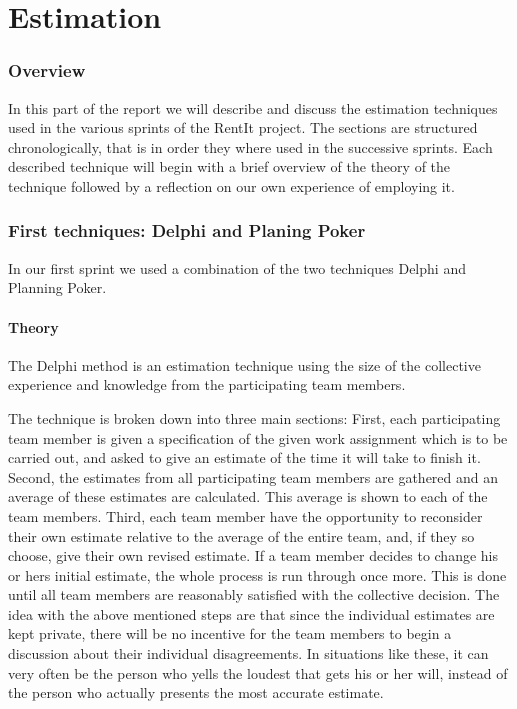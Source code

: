 \part{Estimation}
\section{Overview}
In this part of the report we will describe and discuss the estimation techniques used in the various sprints of the RentIt project. The sections are structured chronologically, that is in order they where used in the successive sprints. Each described technique will begin with a brief overview of the theory of the technique followed by a reflection on our own experience of employing it.

\section{First techniques: Delphi and Planing Poker}
In our first sprint we used a combination of the two techniques Delphi and Planning Poker.

\subsection{Theory}


The Delphi method is an estimation technique using the size of the collective experience and knowledge from the participating team members.

The technique is broken down into three main sections:
First, each participating team member is given a specification of the given work assignment which is to be carried out, and asked to give an estimate of the time it will take to finish it.
Second, the estimates from all participating team members are gathered and an average of these estimates are calculated. This average is shown to each of the team members.
Third, each team member have the opportunity to reconsider their own estimate relative to the average of the entire team, and, if they so choose, give their own revised estimate.
If a team member decides to change his or hers initial estimate, the whole process is run through once more. This is done until all team members are reasonably satisfied with the collective decision. 
The idea with the above mentioned steps are that since the individual estimates are kept private, there will be no incentive for the team members to begin a discussion about their individual disagreements. In situations like these, it can very often be the person who yells the loudest that gets his or her will, instead of the person who actually presents the most accurate estimate.


